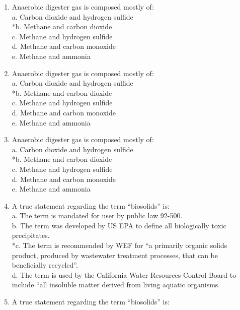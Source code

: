 \documentclass{article}
\begin{document}
\begin{enumerate}
\item  Anaerobic digester gas is composed mostly of: \\

a. Carbon dioxide and hydrogen sulfide \\
*b. Methane and carbon dioxide \\
c. Methane and hydrogen sulfide \\
d. Methane and carbon monoxide \\
e. Methane and ammonia \\

\item  Anaerobic digester gas is composed mostly of: \\

a. Carbon dioxide and hydrogen sulfide \\
*b. Methane and carbon dioxide \\
c. Methane and hydrogen sulfide \\
d. Methane and carbon monoxide \\
e. Methane and ammonia \\

\item  Anaerobic digester gas is composed mostly of: \\

a. Carbon dioxide and hydrogen sulfide \\
*b. Methane and carbon dioxide \\
c. Methane and hydrogen sulfide \\
d. Methane and carbon monoxide \\
e. Methane and ammonia \\

\item  A true statement regarding the term “biosolids” is: \\

a. The term is mandated for user by public law 92-500. \\
b. The term was developed by US EPA to define all biologically toxic precipitates. \\
*c. The term is recommended by WEF for “a primarily organic solids product, produced by wastewater treatment processes, that can be beneficially recycled”. \\
d. The term is used by the California Water Resources Control Board to include “all insoluble matter derived from living aquatic organisms. \\

\item  A true statement regarding the term “biosolids” is: \\


\end{enumerate}
\end{document}
